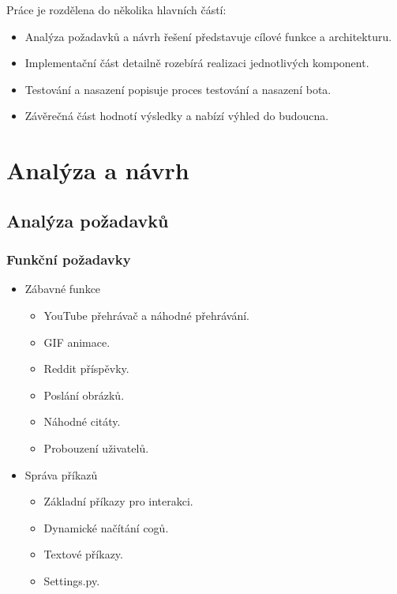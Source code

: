 \documentclass[12pt, a4paper]{report}
\begin{document}
Práce je rozdělena do několika hlavních částí:
\begin{itemize}
    \item Analýza požadavků a návrh řešení představuje cílové funkce a architekturu.
    \item Implementační část detailně rozebírá realizaci jednotlivých komponent.
    \item Testování a nasazení popisuje proces testování a nasazení bota.
    \item Závěrečná část hodnotí výsledky a nabízí výhled do budoucna.
\end{itemize}
\chapter{Analýza a návrh}

\section{Analýza požadavků}
\subsection{Funkční požadavky}
\begin{itemize}
    \item Zábavné funkce
    \begin{itemize}
        \item YouTube přehrávač a náhodné přehrávání.
        \item GIF animace.
        \item Reddit příspěvky.
        \item Poslání obrázků.
        \item Náhodné citáty.
        \item Probouzení uživatelů.
    \end{itemize}
    \item Správa příkazů
    \begin{itemize}
        \item Základní příkazy pro interakci.
        \item Dynamické načítání cogů.
        \item Textové příkazy.
        \item Settings.py.
    \end{itemize}
\end{itemize}
\end{document}
